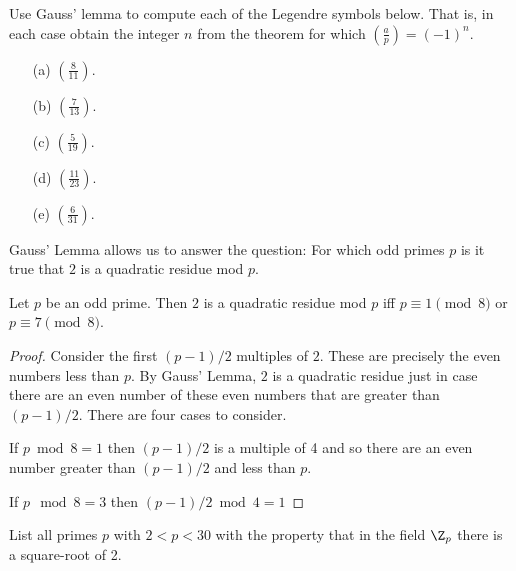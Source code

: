 \documentclass[oneside,12pt]{amsart}
\begin{document}
\begin{homework}
Use Gauss' lemma to compute each of the Legendre symbols below. That is, in each case
obtain the integer $n$ from the theorem for which $\left( \frac{a}{p} \right) = (-1)^n$.
\begin{enumerate}
\item[(a)] $\left( \frac{8}{11} \right)$.
\item[(b)] $\left( \frac{7}{13} \right)$.
\item[(c)] $\left( \frac{5}{19} \right)$. 
\item[(d)] $\left( \frac{11}{23} \right)$. 
\item[(e)] $\left( \frac{6}{31} \right)$.
\end{enumerate}
\end{homework}

Gauss' Lemma allows us to answer the question: For which odd primes $p$ is it true that $2$ is a quadratic residue mod $p$.

\begin{theorem}
Let $p$ be an odd prime. Then $2$ is a quadratic residue mod $p$ iff $p\equiv 1 \pmod 8$ or $p\equiv 7 \pmod 8$.
\end{theorem}
\begin{proof}
Consider the first $(p-1)/2$ multiples of $2$. These are precisely the even numbers less than $p$. By Gauss' Lemma, $2$ is
a quadratic residue just in case there are an even number of these even numbers that are greater than $(p-1)/2$. There are four
cases to consider.

If $p\bmod 8 = 1$ then $(p-1)/2$ is a multiple of 4 and so there are an even number greater than $(p-1)/2$ and less than $p$.

If $p\mod 8 = 3$ then $(p-1)/2 \bmod 4 = 1$
\end{proof}

\begin{homework}
List all primes $p$ with $2<p<30$ with the property that in the field $\Z_p$ there is a square-root of 2.
\end{homework}




\end{document}
